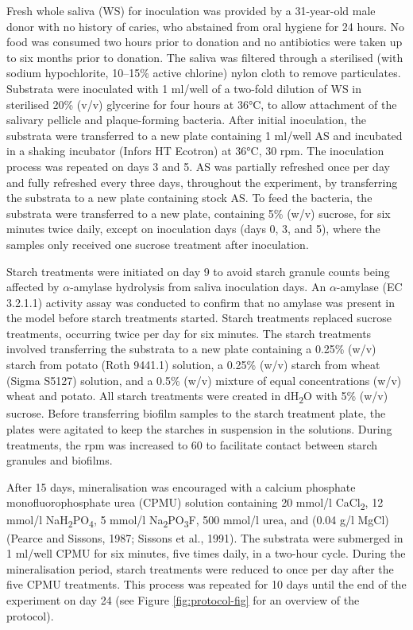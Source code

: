 \documentclass[utf8]{../templates/frontiersSCNS}
\begin{document}
Fresh whole saliva (WS) for inoculation was provided by a 31-year-old male donor
with no history of caries, who abstained from oral hygiene for 24 hours. No
food was consumed two hours prior to donation and no antibiotics were taken up
to six months prior to donation.
The saliva was filtered through a sterilised (with sodium hypochlorite, 10--15\% active chlorine)
nylon cloth to remove particulates.
Substrata were inoculated with 1 ml/well of a two-fold dilution of WS in sterilised
20\% (v/v) glycerine for four hours at 36°C, to allow attachment of the
salivary pellicle and plaque-forming bacteria. After initial inoculation, the
substrata were transferred to a new plate containing 1 ml/well AS and incubated
in a shaking incubator (Infors HT Ecotron) at 36°C, 30 rpm.
The inoculation process was repeated on days 3 and 5.
AS was partially refreshed once per day and fully refreshed every three days,
throughout the experiment, by transferring the substrata to a new plate containing
stock AS. To feed the bacteria, the substrata were transferred to a new plate, containing
5\% (w/v) sucrose, for six minutes twice daily, except on inoculation days
(days 0, 3, and 5), where the samples only received one sucrose treatment after
inoculation.

Starch treatments were initiated on day 9 to avoid starch granule counts being
affected by \(\alpha\)-amylase hydrolysis from saliva inoculation days.
An \(\alpha\)-amylase (EC 3.2.1.1) activity
assay was conducted to confirm that no amylase was present in the model before
starch treatments started. Starch treatments replaced sucrose treatments, occurring twice per day
for six minutes. The starch treatments involved transferring the substrata to a
new plate containing a 0.25\% (w/v) starch from potato (Roth 9441.1) solution, a 0.25\% (w/v) starch from wheat (Sigma S5127) solution, and a 0.5\% (w/v) mixture of equal
concentrations (w/v) wheat and potato. All starch treatments were created in dH\textsubscript{2}O
with 5\% (w/v) sucrose. Before transferring biofilm samples to the starch treatment
plate, the plates were agitated to keep the starches in suspension in the
solutions. During treatments, the rpm was increased to 60 to facilitate contact
between starch granules and biofilms.

After 15 days, mineralisation was encouraged with a
calcium phosphate monofluorophosphate urea (CPMU) solution containing
20 mmol/l CaCl\textsubscript{2}, 12 mmol/l NaH\textsubscript{2}PO\textsubscript{4}, 5 mmol/l Na\textsubscript{2}PO\textsubscript{3}F, 500 mmol/l urea,
and (0.04 g/l MgCl)
(Pearce and Sissons, 1987; Sissons et al., 1991).
The substrata were submerged in 1 ml/well CPMU for six minutes, five times
daily, in a two-hour cycle. During the mineralisation period, starch treatments
were reduced to once per day after the five CPMU treatments. This process was repeated
for 10 days until the end of the experiment on day 24
(see Figure \ref{fig:protocol-fig} for an overview of the protocol).
\end{document}
